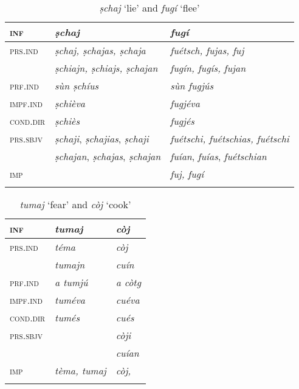 \begin{table}
	\caption{\textit{ṣchaj} `lie' and \textit{fugí} `flee'}
	\label{}
	\begin{tabular}{lll}
		\lsptoprule
		\textsc{inf} & \textbf{\textit{ṣchaj}} & \textbf{\textit{\textit{fugí}}}\\
		\midrule
		\textsc{prs.ind} & \textit{ṣchaj, ṣchajas, ṣchaja} & \textit{fuétsch, fujas, fuj}\\
		& \textit{ṣchiajn, ṣchiajs, ṣchajan} & \textit{fugín, fugís, fujan}\\
		\textsc{prf.ind} & \textit{sùn ṣchíus} & \textit{sùn fugjús}\\
		\textsc{impf.ind} & \textit{ṣchièva} & \textit{fugjéva}\\
		\textsc{cond.dir} & \textit{ṣchiès} & \textit{fugjés}\\
		\textsc{prs.sbjv} & \textit{ṣchaji}, \textit{ṣchajias}, \textit{ṣchaji} & \textit{fuétschi, fuétschias, fuétschi}\\
	&	\textit{ṣchajan}, \textit{ṣchajas}, \textit{ṣchajan} & \textit{fuían}, \textit{fuías}, \textit{fuétschian}\\
		\textsc{imp} & & \textit{fuj, fugí}\\
		\lspbottomrule
	\end{tabular}
\end{table}


\begin{table}
	\caption{\textit{tumaj} `fear'  and \textit{còj} `cook'}
	\label{}
	\begin{tabular}{lll}
		\lsptoprule
		\textsc{inf} & \textit{\textbf{tumaj}} & \textit{\textbf{còj}}\\
		\midrule
		\textsc{prs.ind} & \textit{téma} & \textit{còj} \\
		& \textit{tumajn} & \textit{cuín} \\
		\textsc{prf.ind} & \textit{a tumjú} & \textit{a còtg}\\
		\textsc{impf.ind} & \textit{tuméva} & \textit{cuéva}\\
		\textsc{cond.dir} & \textit{tumés} & \textit{cués}\\
		\textsc{prs.sbjv} & & \textit{còji}\\
		& & \textit{cuían}\\
		\textsc{imp} & \textit{tèma, tumaj} & \textit{còj, }\\
		\lspbottomrule
	\end{tabular}
\end{table}


